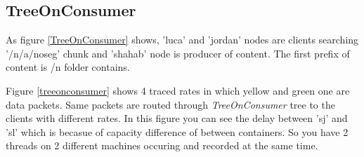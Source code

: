 \subsection{TreeOnConsumer}
As figure \ref{TreeOnConsumer} shows, 'luca' and 'jordan' nodes are clients searching '/n/a/noseg' chunk and 'shahab' node is producer of content. The first prefix of content is /n folder contains.

Figure \ref{treeonconsumer} shows 4 traced rates in which yellow and green one are data packets. Same packets are routed through \textit{TreeOnConsumer} tree to the clients with different rates. In this figure you can see the delay between 'sj' and 'sl' which is becasue of capacity difference of between containers. So you have 2 threads on 2 different machines occuring and recorded at the same time.

